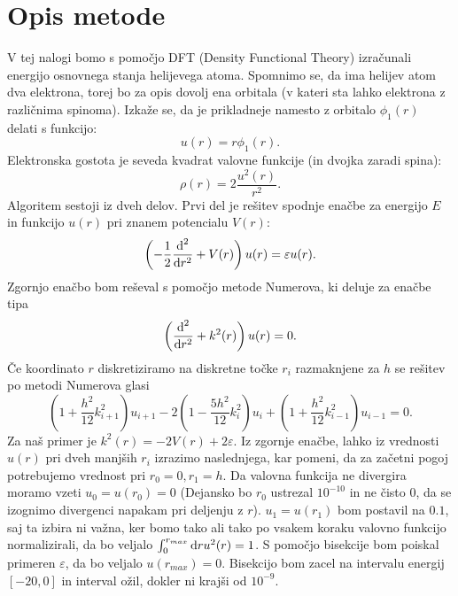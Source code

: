 \documentclass{article}
\begin{document}
\section*{Opis metode}
V tej nalogi bomo s pomočjo DFT (Density Functional Theory) izračunali energijo osnovnega stanja helijevega atoma.
Spomnimo se, da ima helijev atom dva elektrona, torej bo za opis dovolj ena orbitala (v kateri sta lahko elektrona z različnima spinoma).
Izkaže se, da je prikladneje namesto z orbitalo $\phi_1(r)$ delati s funkcijo:
\begin{equation*}
u(r) = r \phi_1(r).
\end{equation*}
Elektronska gostota je seveda kvadrat valovne funkcije (in dvojka zaradi spina):
\begin{equation*}
\rho(r) = 2 \frac{u^2(r)}{r^2}.
\end{equation*}
Algoritem sestoji iz dveh delov. Prvi del je rešitev spodnje enačbe za energijo $E$ in funkcijo $u(r)$ pri znanem potencialu $V(r)$:
\begin{equation*}
\left( -\frac{1}{2} \frac{\textup{d}^2}{\textup{d}r^2} + V(r) \right) u(r) = \varepsilon u(r).
\end{equation*}
Zgornjo enačbo bom reševal s pomočjo metode Numerova, ki  deluje za enačbe tipa
\begin{equation*}
\left( \frac{\textup{d}^2}{\textup{d}r^2} + k^2(r) \right) u(r) = 0.
\end{equation*}
Če koordinato $r$ diskretiziramo na diskretne točke $r_i$ razmaknjene za $h$ se rešitev po metodi Numerova glasi
\begin{equation*}
\left(1 + \frac{h^2}{12} k_{i+1}^2 \right) u_{i+1} - 2 \left( 1 - \frac{5 h^2}{12} k_i^2 \right) u_i + \left( 1 + \frac{h^2}{12} k_{i-1}^2 \right) u_{i-1} = 0.
\end{equation*}
Za naš primer je $k^2(r) = -2V(r) + 2\varepsilon$. Iz zgornje enačbe, lahko iz vrednosti $u(r)$ pri dveh manjših $r_i$ izrazimo naslednjega, kar pomeni, da za začetni pogoj potrebujemo vrednost pri $r_0 = 0, r_1 = h$. Da valovna funkcija ne divergira moramo vzeti $u_0 = u(r_0)=0$ (Dejansko bo $r_0$ ustrezal $10^{-10}$ in ne čisto $0$, da se izognimo divergenci napakam pri deljenju z $r$). $u_1 = u(r_1)$ bom postavil na $0.1$, saj ta izbira ni važna, ker bomo tako ali tako po vsakem koraku valovno funkcijo normalizirali, da bo veljalo $\int_0^{r_{max}} \textup{d}r u^2(r) = 1$.
S pomočjo bisekcije bom poiskal primeren $\varepsilon$, da bo veljalo $u(r_{max})=0$. Bisekcijo bom zacel na intervalu energij $[-20,0]$ in interval ožil, dokler ni krajši od $10^{-9}$.
\end{document}
